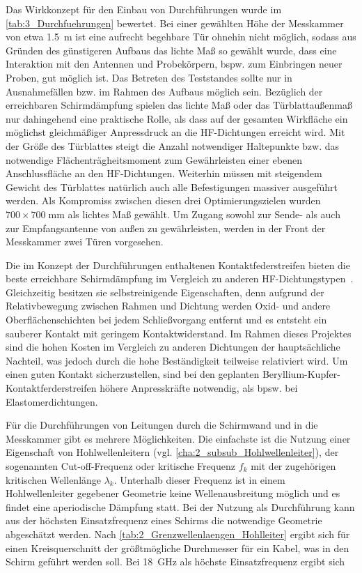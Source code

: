 \par
\vspace{\linespace} 
Das Wirkkonzept für den Einbau von Durchführungen wurde im \Abschnitt\ref{tab:3_Durchfuehrungen} bewertet. Bei einer gewählten Höhe der Messkammer von etwa \SI{1,5}{\meter} ist eine aufrecht begehbare Tür ohnehin nicht möglich, sodass aus Gründen des günstigeren Aufbaus das lichte Maß so gewählt wurde, dass eine Interaktion mit den Antennen und Probekörpern, bspw. zum Einbringen neuer Proben, gut möglich ist. Das Betreten des Teststandes sollte nur in Ausnahmefällen bzw. im Rahmen des Aufbaus möglich sein. Bezüglich der erreichbaren Schirmdämpfung spielen das lichte Maß oder das Türblattaußenmaß nur dahingehend eine praktische Rolle, als dass auf der gesamten Wirkfläche ein möglichst gleichmäßiger Anpressdruck an die HF-Dichtungen erreicht wird. Mit der Größe des Türblattes steigt die Anzahl notwendiger Haltepunkte bzw. das notwendige Flächenträgheitsmoment zum Gewährleisten einer ebenen Anschlussfläche an den HF-Dichtungen. Weiterhin müssen mit steigendem Gewicht des Türblattes natürlich auch alle Befestigungen massiver ausgeführt werden. Als Kompromiss zwischen diesen drei Optimierungszielen wurden $700 \times 700\;\si{\milli\meter}$ als lichtes Maß gewählt. Um Zugang sowohl zur Sende- als auch zur Empfangsantenne von außen zu gewährleisten, werden in der Front der Messkammer zwei Türen vorgesehen.
\par
\vspace{\linespace}
Die im Konzept der Durchführungen enthaltenen Kontaktfederstreifen bieten die beste erreichbare Schirmdämpfung im Vergleich zu anderen HF-Dichtungstypen~\cite{EM_Schirmung}. Gleichzeitig besitzen sie selbstreinigende Eigenschaften, denn aufgrund der Relativbewegung zwischen Rahmen und Dichtung werden Oxid- und andere Oberflächenschichten bei jedem Schließvorgang entfernt und es entsteht ein sauberer Kontakt mit geringem Kontaktwiderstand. Im Rahmen dieses Projektes sind die hohen Kosten im Vergleich zu anderen Dichtungen der hauptsächliche Nachteil, was jedoch durch die hohe Beständigkeit teilweise relativiert wird. Um einen guten Kontakt sicherzustellen, sind bei den geplanten Beryllium-Kupfer-Kontaktferderstreifen höhere Anpresskräfte notwendig, als bpsw. bei Elastomerdichtungen.  
\par
\vspace{\linespace}
Für die Durchführungen von Leitungen durch die Schirmwand und in die Messkammer gibt es mehrere Möglichkeiten. Die einfachste ist die Nutzung einer Eigenschaft von Hohlwellenleitern (vgl. \Abschnitt\ref{cha:2_subsub_Hohlwellenleiter}), der sogenannten Cut-off-Frequenz oder kritische Frequenz $f_k$ mit der zugehörigen kritischen Wellenlänge $\lambda_k$. Unterhalb dieser Frequenz ist in einem Hohlwellenleiter gegebener Geometrie keine Wellenausbreitung möglich und es findet eine aperiodische Dämpfung statt. Bei der Nutzung als Durchführung kann aus der höchsten Einsatzfrequenz eines Schirms die notwendige Geometrie abgeschätzt werden. Nach \Tabelle\ref{tab:2_Grenzwellenlaengen_Hohlleiter} ergibt sich für einen Kreisquerschnitt der größtmögliche Durchmesser für ein Kabel, was in den Schirm geführt werden soll. Bei \SI{18}{\giga\hertz} als höchste Einsatzfrequenz ergibt sich

